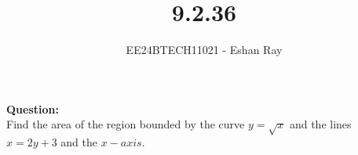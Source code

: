 \documentclass[journal]{IEEEtran}
\begin{document}

\vspace{3cm}

\title{9.2.36}
\author{EE24BTECH11021 - Eshan Ray}

{\let\newpage\relax\maketitle}

\renewcommand{\thefigure}{\theenumi}
\renewcommand{\thetable}{\theenumi}
\setlength{\intextsep}{10pt} %




\textbf{Question: }\\
Find the area of the region bounded by the curve $y = \sqrt{x}$ and the lines $x = 2y  + 3$ and
the $x-axis$.\\
\end{document}
